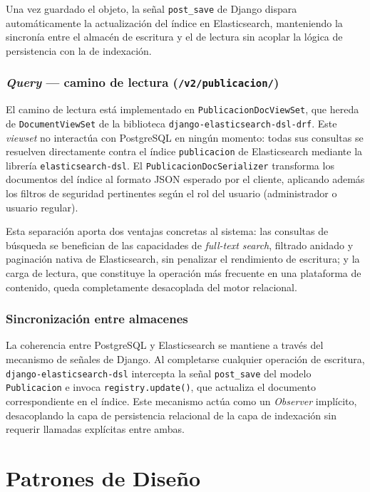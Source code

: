 Una vez guardado el objeto, la señal \texttt{post\_save} de Django dispara
automáticamente la actualización del índice en Elasticsearch, manteniendo la sincronía
entre el almacén de escritura y el de lectura sin acoplar la lógica de persistencia
con la de indexación.

\subsubsection*{\textit{Query} — camino de lectura (\texttt{/v2/publicacion/})}

El camino de lectura está implementado en \texttt{PublicacionDocViewSet}, que hereda
de \texttt{DocumentViewSet} de la biblioteca \texttt{django-elasticsearch-dsl-drf}.
Este \textit{viewset} no interactúa con PostgreSQL en ningún momento: todas sus
consultas se resuelven directamente contra el índice \texttt{publicacion} de
Elasticsearch mediante la librería \texttt{elasticsearch-dsl}. El
\texttt{PublicacionDocSerializer} transforma los documentos del índice al formato
JSON esperado por el cliente, aplicando además los filtros de seguridad pertinentes
según el rol del usuario (administrador o usuario regular).

Esta separación aporta dos ventajas concretas al sistema: las consultas de búsqueda
se benefician de las capacidades de \textit{full-text search}, filtrado anidado y
paginación nativa de Elasticsearch, sin penalizar el rendimiento de escritura; y la
carga de lectura, que constituye la operación más frecuente en una plataforma de
contenido, queda completamente desacoplada del motor relacional.

\subsubsection*{Sincronización entre almacenes}

La coherencia entre PostgreSQL y Elasticsearch se mantiene a través del mecanismo
de señales de Django. Al completarse cualquier operación de escritura,
\texttt{django-elasticsearch-dsl} intercepta la señal \texttt{post\_save} del modelo
\texttt{Publicacion} e invoca \texttt{registry.update()}, que actualiza el documento
correspondiente en el índice. Este mecanismo actúa como un \textit{Observer} implícito,
desacoplando la capa de persistencia relacional de la capa de indexación sin requerir
llamadas explícitas entre ambas.

\section{Patrones de Diseño}

